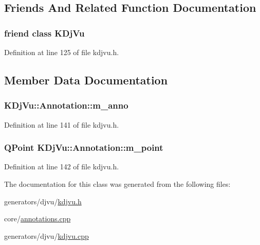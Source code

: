 \subsection{Friends And Related Function Documentation}
\hypertarget{classKDjVu_1_1Annotation_a4241ce0336d22245ffdb13dd5cb6edcc}{
\subsubsection[{K\+Dj\+Vu}]{\setlength{\rightskip}{0pt plus 5cm}friend class {\bf K\+Dj\+Vu}\hspace{0.3cm}{\ttfamily [friend]}}}\label{classKDjVu_1_1Annotation_a4241ce0336d22245ffdb13dd5cb6edcc}


Definition at line 125 of file kdjvu.\+h.



\subsection{Member Data Documentation}
\hypertarget{classKDjVu_1_1Annotation_a7334ba00c896becbe9630c5f2e1bbd28}{
\subsubsection[{m\+\_\+anno}]{ K\+Dj\+Vu\+::\+Annotation\+::m\+\_\+anno\hspace{0.3cm}{\ttfamily [protected]}}}\label{classKDjVu_1_1Annotation_a7334ba00c896becbe9630c5f2e1bbd28}


Definition at line 141 of file kdjvu.\+h.

\hypertarget{classKDjVu_1_1Annotation_af406a7ca02accb64486f23888197c2cb}{
\subsubsection[{m\+\_\+point}]{\setlength{\rightskip}{0pt plus 5cm}Q\+Point K\+Dj\+Vu\+::\+Annotation\+::m\+\_\+point\hspace{0.3cm}{\ttfamily [protected]}}}\label{classKDjVu_1_1Annotation_af406a7ca02accb64486f23888197c2cb}


Definition at line 142 of file kdjvu.\+h.



The documentation for this class was generated from the following files\+:\begin{DoxyCompactItemize}
\item 
generators/djvu/\hyperlink{kdjvu_8h}{kdjvu.\+h}\item 
core/\hyperlink{annotations_8cpp}{annotations.\+cpp}\item 
generators/djvu/\hyperlink{kdjvu_8cpp}{kdjvu.\+cpp}\end{DoxyCompactItemize}
